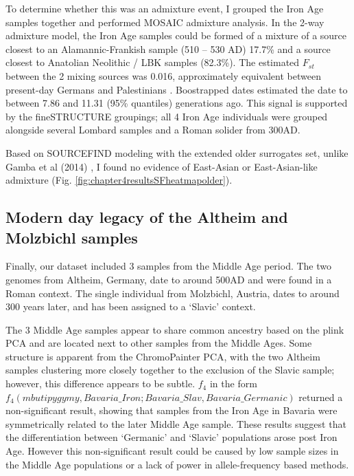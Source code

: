 To determine whether this was an admixture event, I grouped the Iron Age samples together and performed MOSAIC admixture analysis. In the 2-way admixture model, the Iron Age samples could be formed of a mixture of a source closest to an Alamannic-Frankish sample (510 – 530 AD) 17.7\% and a source closest to Anatolian Neolithic / LBK samples (82.3\%). The estimated $F_{st}$ between the 2 mixing sources was 0.016, approximately equivalent between present-day Germans and Palestinians \cite{nelis2009genetic}.  Boostrapped dates estimated the date to between 7.86 and 11.31 (95\% quantiles) generations ago. This signal is supported by the fineSTRUCTURE groupings; all 4 Iron Age individuals were grouped alongside several Lombard samples and a Roman solider from 300AD. 

Based on SOURCEFIND modeling with the extended older surrogates set, unlike Gamba et al (2014) \cite{Gamba2014}, I found no evidence of East-Asian or East-Asian-like admixture (Fig. \ref{fig:chapter4resultsSFheatmapolder}).


\subsection{Modern day legacy of the Altheim and Molzbichl samples}

Finally, our dataset included 3 samples from the Middle Age period. The two genomes from Altheim, Germany, date to around 500AD and were found in a Roman context. The single individual from Molzbichl, Austria, dates to around 300 years later, and has been assigned to a `Slavic' context.  

The 3 Middle Age samples appear to share common ancestry based on the plink PCA and are located next to other samples from the Middle Ages. Some structure is apparent from the ChromoPainter PCA, with the two Altheim samples clustering more closely together to the exclusion of the Slavic sample; however, this difference appears to be subtle. $f_{4}$ in the form $f_{4}(mbutipygymy, Bavaria\_Iron; Bavaria\_Slav, Bavaria\_Germanic)$ returned a non-significant result, showing that samples from the Iron Age in Bavaria were symmetrically related to the later Middle Age sample. These results suggest that the differentiation between `Germanic' and `Slavic' populations arose post Iron Age. However this non-significant result could be caused by low sample sizes in the Middle Age populations or a lack of power in allele-frequency based methods.

